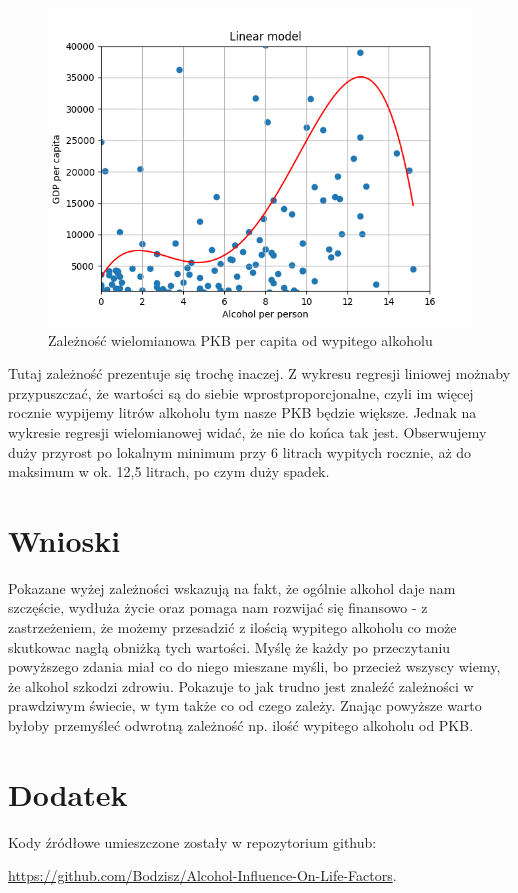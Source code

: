 \documentclass[10pt]{article}
\begin{document}
\begin{figure}[H]
    \begin{center}
        \includegraphics[width=0.8\linewidth]{plots/GDP_dependence_poly.png}
        \caption{Zależność wielomianowa PKB per capita od wypitego alkoholu}
    \end{center}
\end{figure}

Tutaj zależność prezentuje się trochę inaczej.
Z wykresu regresji liniowej możnaby przypuszczać, że wartości są do siebie wprostproporcjonalne, czyli im więcej rocznie wypijemy litrów alkoholu tym nasze PKB będzie większe.
Jednak na wykresie regresji wielomianowej widać, że nie do końca tak jest.
Obserwujemy duży przyrost po lokalnym minimum przy 6 litrach wypitych rocznie, aż do maksimum w ok. 12,5 litrach, po czym duży spadek.

\section{Wnioski}
Pokazane wyżej zależności wskazują na fakt, że ogólnie alkohol daje nam szczęście, wydłuża życie oraz pomaga nam rozwijać się finansowo - z zastrzeżeniem, że możemy przesadzić z ilością wypitego alkoholu co może skutkowac nagłą obniżką tych wartości.
Myślę że każdy po przeczytaniu powyższego zdania miał co do niego mieszane myśli, bo przecież wszyscy wiemy, że alkohol szkodzi zdrowiu.
Pokazuje to jak trudno jest znaleźć zależności w prawdziwym świecie, w tym także co od czego zależy. Znając powyższe warto byłoby przemyśleć odwrotną zależność np. ilość wypitego alkoholu od PKB.

\pagebreak
\appendix
\section{Dodatek}
Kody źródłowe umieszczone zostały w repozytorium github:

\noindent \url{https://github.com/Bodzisz/Alcohol-Influence-On-Life-Factors}.
\end{document}
